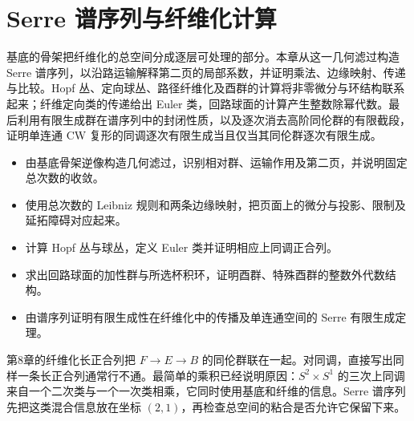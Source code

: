 
% 
% 

\chapter{Serre 谱序列与纤维化计算}
\label{g2:ch:11}

\begin{chapterabstract}
	基底的骨架把纤维化的总空间分成逐层可处理的部分。本章从这一几何滤过构造 Serre 谱序列，以沿路运输解释第二页的局部系数，并证明乘法、边缘映射、传递与比较。Hopf 丛、定向球丛、路径纤维化及酉群的计算将非零微分与环结构联系起来；纤维定向类的传递给出 Euler 类，回路球面的计算产生整数除幂代数。最后利用有限生成群在谱序列中的封闭性质，以及逐次消去高阶同伦群的有限截段，证明单连通 CW 复形的同调逐次有限生成当且仅当其同伦群逐次有限生成。
\end{chapterabstract}

\begin{learninggoals}
	\begin{itemize}
		\item 由基底骨架逆像构造几何滤过，识别相对群、运输作用及第二页，并说明固定总次数的收敛。
		\item 使用总次数的 Leibniz 规则和两条边缘映射，把页面上的微分与投影、限制及延拓障碍对应起来。
		\item 计算 Hopf 丛与球丛，定义 Euler 类并证明相应上同调正合列。
		\item 求出回路球面的加性群与所选杯积环，证明酉群、特殊酉群的整数外代数结构。
		\item 由谱序列证明有限生成性在纤维化中的传播及单连通空间的 Serre 有限生成定理。
	\end{itemize}
\end{learninggoals}

第8章的纤维化长正合列把 \(F\to E\to B\) 的同伦群联在一起。对同调，直接写出同样一条长正合列通常行不通。最简单的乘积已经说明原因：\(S^2\times S^1\) 的三次上同调来自一个二次类与一个一次类相乘，它同时使用基底和纤维的信息。Serre 谱序列先把这类混合信息放在坐标 \((2,1)\)，再检查总空间的粘合是否允许它保留下来。

\ProseParagraphBreak

